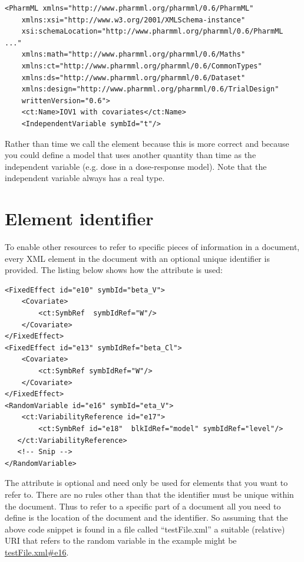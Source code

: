 \lstset{language=XML}
\begin{lstlisting}
<PharmML xmlns="http://www.pharmml.org/pharmml/0.6/PharmML"
    xmlns:xsi="http://www.w3.org/2001/XMLSchema-instance"
    xsi:schemaLocation="http://www.pharmml.org/pharmml/0.6/PharmML ..."
    xmlns:math="http://www.pharmml.org/pharmml/0.6/Maths"
    xmlns:ct="http://www.pharmml.org/pharmml/0.6/CommonTypes"
    xmlns:ds="http://www.pharmml.org/pharmml/0.6/Dataset"
    xmlns:design="http://www.pharmml.org/pharmml/0.6/TrialDesign"
    writtenVersion="0.6">
    <ct:Name>IOV1 with covariates</ct:Name>
    <IndependentVariable symbId="t"/>
\end{lstlisting}

Rather than time we call the element 
because this is more correct and because you could define a model that
uses another quantity than time as the independent variable (e.g.\xspace
dose in a dose-response model). Note that the independent variable
always has a real type.

\section{Element identifier}
\label{sec:element-id}

To enable other resources to refer to
specific pieces of information in a \pharmml document,
every XML element in the document with an optional unique
identifier is provided. The listing below shows how the  attribute is
used:
%
\lstset{language=XML}
\begin{lstlisting}
<FixedEffect id="e10" symbId="beta_V">
    <Covariate>
        <ct:SymbRef  symbIdRef="W"/>
    </Covariate>
</FixedEffect>
<FixedEffect id="e13" symbIdRef="beta_Cl">
    <Covariate>
        <ct:SymbRef symbIdRef="W"/>
    </Covariate>
</FixedEffect>
<RandomVariable id="e16" symbId="eta_V">
    <ct:VariabilityReference id="e17">
        <ct:SymbRef id="e18"  blkIdRef="model" symbIdRef="level"/>
   </ct:VariabilityReference>
   <!-- Snip -->
</RandomVariable>
\end{lstlisting}
%
The  attribute is optional and need only be
used for elements that you want to refer to. There are no rules other
than that the identifier must be unique within the \pharmml document.
Thus to refer to a specific part of a document all you need to define is
the location of the document and the identifier. So assuming that the
above code snippet is found in a file called ``testFile.xml'' a
suitable (relative) URI that refers to the random variable in the
example might be \url{testFile.xml#e16}.

